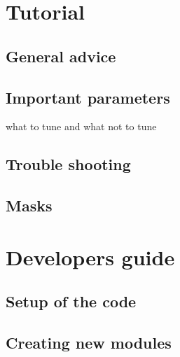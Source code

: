 \documentclass[]{report}
\begin{document}
\chapter{Tutorial}


\section{General advice}

\section{Important parameters}

what to tune and what not to tune

\section{Trouble shooting}

\section{Masks}


\chapter{Developers guide}

\section{Setup of the code}

\section{Creating new modules}
\end{document}
